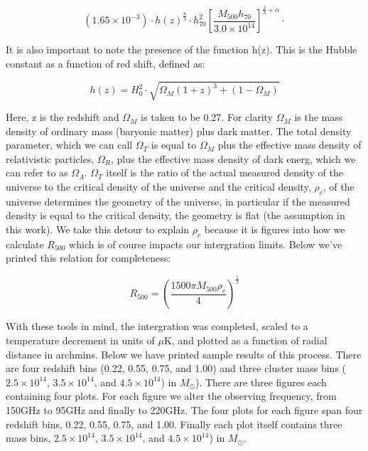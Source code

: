 \documentclass[12pt]{article} %
\begin{document}
\begin{equation}
(1.65 \times 10^{-3}) \cdotp h(z)^\frac{8}{3} \cdotp h^2_{70}[\frac{M_{500}h_{70}}{3.0 \times 10^{14}}]^{\frac{2}{3} + \alpha} \cdotp 
\end{equation}

It is also important to note the presence of the function h(z). This is the Hubble constant as a function of red shift, defined as:
 
\begin{equation}
h(z) =H_0^2 \cdotp \sqrt{\Omega_M(1 + z)^3 + (1 - \Omega_M)}
\end{equation}

Here, z is the redshift and $\Omega_M$ is taken to be 0.27. For clarity $\Omega_M$ is the mass density of ordinary mass (baryonic matter) plus dark matter. The total density parameter, which we can call $\Omega_T$ is equal to $\Omega_M$  plus the effective mass density of relativistic particles, $\Omega_R$, plus the effective mass density of dark energ, which we can refer to as $\Omega_\Lambda$. $\Omega_T$ itself is the ratio of the actual measured density of the universe to the critical density of the universe and the critical density,  $\rho_c$, of the universe determines the geometry of the universe, in particular if the measured density is equal to the critical density, the geometry is flat (the assumption in this work). We take this detour to explain $\rho_c$ because it is figures into how we calculate $R_{500}$ which is of course impacts our intergration limits. Below we've printed this relation for completeness: 

\begin{equation}
R_{500} = (\frac{1500\pi M_{500}\rho_c}{4})^\frac{1}{3}
\end{equation}

With these tools in mind, the intergration was completed, scaled to a temperature decrement in units of $\mu$K, and plotted as a function of radial distance in archmins. Below we have printed sample results of this process. There are four redshift bins (0.22, 0.55, 0.75, and 1.00) and three cluster mass bins ( $2.5\times 10^{14}$,  $3.5\times 10^{14}$, and  $4.5\times 10^{14}$) in $M_{\odot}$).  There are three figures each containing four plots. For each figure we alter the observing frequency, from 150GHz to 95GHz and finally to 220GHz. The four plots for each figure span four redshift bins, 0.22, 0.55, 0.75, and 1.00. Finally each plot itself contains three mass bins, $2.5\times 10^{14}$,  $3.5\times 10^{14}$, and  $4.5\times 10^{14}$) in $M_{\odot}$.
\end{document}
